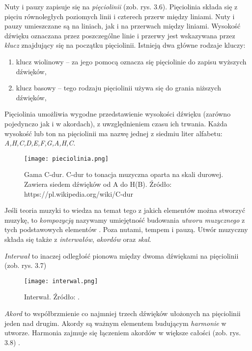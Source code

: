 Nuty i pauzy zapisuje się na \textit{pięciolinii} (zob. rys. 3.6). Pięciolinia składa się z pięciu równoległych poziomych linii i czterech przerw między liniami. Nuty i pauzy umieszczane są na liniach, jak i na przerwach między liniami. Wysokość dźwięku oznaczana przez poszczególne linie i przerwy jest wskazywana przez \textit{klucz} znajdujący się na początku pięciolinii. Istnieją dwa główne rodzaje kluczy:
\begin{enumerate}
    \item klucz wiolinowy -- za jego pomocą oznacza się pięciolinie do zapisu wyższych dźwięków,
    \item klucz basowy -- tego rodzaju pięciolinii używa się do grania niższych dźwięków,
\end{enumerate}

Pięciolinia umożliwia wygodne przedstawienie wysokości dźwięku (zarówno pojedynczo jak i w akordach), z uwzględnieniem czasu ich trwania.
 Każda wysokość lub ton na pięciolinii ma nazwę jednej z siedmiu liter alfabetu: \textit{A,H,C,D,E,F,G,A,H,C}.
 
 \begin{figure}[H]
\texttt{[image: pieciolinia.png]}
\centering
\caption{Gama C-dur. C-dur to tonacja muzyczna oparta na skali durowej. Zawiera siedem dźwięków od A do H(B). Źródło: https://pl.wikipedia.org/wiki/C-dur}
\centering
\end{figure}

Jeśli teoria muzyki to wiedza na temat tego z jakich elementów można stworzyć muzykę, to \textit{kompozycją} nazywamy umiejętność budowania \textit{utworu muzycznego} z tych podstawowych elementów \citep[s. 22]{Usarzewicz2018}.
Poza nutami, tempem i pauzą. Utwór muzyczny składa się także z \textit{interwałów}, \textit{akordów} oraz \textit{skal}.

\textit{Interwał} to inaczej odległość pionowa między dwoma dźwiękami na pięciolinii (zob. rys. 3.7) 

 \begin{figure}[H]
 \centering
\texttt{[image: interwal.png]}
\caption{Interwał. Źródło: \citep[s. 22]{Usarzewicz2018}.}
\centering
\end{figure}

\textit{Akord} to współbrzmienie co najmniej trzech dźwięków ułożonych na pięciolinii jeden nad drugim. Akordy są ważnym elementem budującym \textit{harmonie} w utworze. Harmonia zajmuje się łączeniem akordów w większe całości (zob. rys. 3.8) \citep[s. 23]{Usarzewicz2018}.

